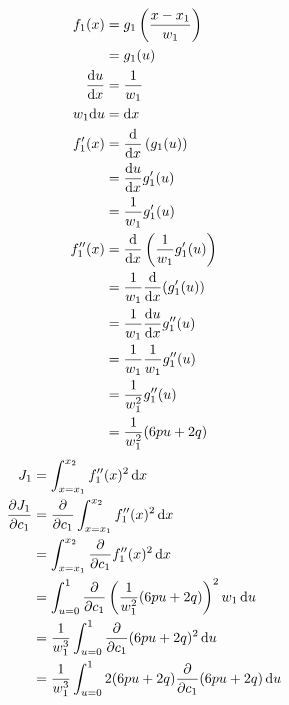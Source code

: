 \documentclass{article}
\begin{document}
\begin{align*}
  f_1(x)
  &= g_1\left(\frac{x-x_1}{w_1}\right) \\
  &= g_1(u) \\
  \frac{\mathrm{d}u}{\mathrm{d}x}
  &= \frac{1}{w_1} \\
  w_1\mathrm{d}u
  &= \mathrm{d}x \\
  f_1'(x)
  &= \frac{\mathrm{d}}{\mathrm{d}x} \left(g_1(u)\right) \\
  &= \frac{\mathrm{d}u}{\mathrm{d}x} g_1'(u) \\
  &= \frac{1}{w_1}g_1'(u) \\
  f_1''(x)
  &= \frac{\mathrm{d}}{\mathrm{d}x} \left(\frac{1}{w_1}g_1'(u)\right) \\
  &= \frac{1}{w_1} \frac{\mathrm{d}}{\mathrm{d}x} (g_1'(u)) \\
  &= \frac{1}{w_1} \frac{\mathrm{d}u}{\mathrm{d}x} g_1''(u) \\
  &= \frac{1}{w_1} \frac{1}{w_1} g_1''(u) \\
  &= \frac{1}{w_1^2} g_1''(u) \\
  &= \frac{1}{w_1^2}(6pu+2q)
\end{align*}
\begin{align*}
  J_1
  &= \int_{x=x_1}^{x_2}f_1''(x)^2\, \mathrm{d}x \\
  \frac{\partial J_1}{\partial c_1}
  &= \frac{\partial}{\partial c_1} \int_{x=x_1}^{x_2} f_1''(x)^2 \, \mathrm{d}x \\
  &= \int_{x=x_1}^{x_2} \frac{\partial}{\partial c_1} f_1''(x)^2 \, \mathrm{d}x \\
  &= \int_{u=0}^{1} \frac{\partial}{\partial c_1} \left(\frac{1}{w_1^2}(6pu+2q)\right)^2 w_1 \, \mathrm{d}u \\
  &= \frac{1}{w_1^3} \int_{u=0}^{1} \frac{\partial}{\partial c_1} (6pu+2q)^2 \, \mathrm{d}u \\
  &= \frac{1}{w_1^3} \int_{u=0}^{1} 2(6pu+2q) \frac{\partial}{\partial c_1} (6pu+2q) \, \mathrm{d}u \\
\end{align*}
\end{document}
